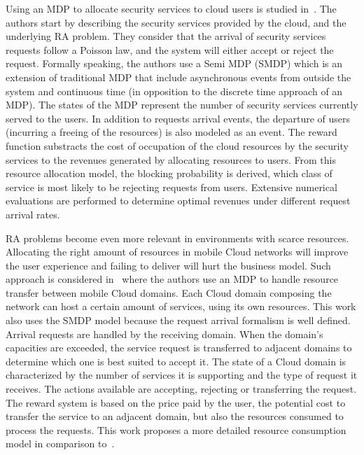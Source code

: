 Using an MDP to allocate security services to cloud users is studied in~\cite{Liang2011}.
The authors start by describing the security services provided by the cloud, and the underlying RA problem.
They consider that the arrival of security services requests follow a Poisson law, and the system will either accept or reject the request. Formally speaking, the authors use a Semi MDP (SMDP) which is an extension of traditional MDP that include asynchronous events from outside the system and continuous time (in opposition to the discrete time approach of an MDP).
The states of the MDP represent the number of security services currently served to the users. In addition to requests arrival events, the departure of users (incurring a freeing of the resources) is also modeled as an event. The reward function substracts the cost of occupation of the cloud resources by the security services to the revenues generated by allocating resources to users. 
From this resource allocation model, the blocking probability is derived, \ie which class of service is most likely to be rejecting requests from users. Extensive numerical evaluations are performed to determine optimal revenues under different request arrival rates.

RA problems become even more relevant in environments with scarce resources.
Allocating the right amount of resources in mobile Cloud networks will improve the user experience and failing to deliver will hurt the business model.
Such approach is considered in~\cite{Liang2012} where the authors use an MDP to handle resource transfer between mobile Cloud domains. Each Cloud domain composing the network can host a certain amount of services, using its own resources. 
This work also uses the SMDP model because the request arrival formalism is well defined.
Arrival requests are handled by the receiving domain. When the domain's capacities are exceeded, the service request is transferred to adjacent domains to determine which one is best suited to accept it.
The state of a Cloud domain is characterized by the number of services it is supporting and the type of request it receives.
The actions available are accepting, rejecting or transferring the request.
The reward system is based on the price paid by the user, the potential cost to transfer the service to an adjacent domain, but also the resources consumed to process the requests. 
This work proposes a more detailed resource consumption model in comparison to~\cite{Liang2011}.

